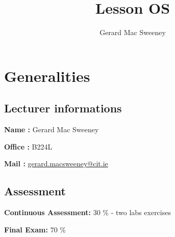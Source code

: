 \documentclass{rapport}
\title{Lesson OS}
\author{Gerard Mac Sweeney}
\begin{document}
\maketitle
\tableofcontents

    \chapter{Generalities}
    \section{Lecturer informations}
    \textbf{Name :} Gerard Mac Sweeney

    \textbf{Office :} B224L

    \textbf{Mail :} \href{mailto:gerard.macsweeney@cit.ie}{gerard.macsweeney@cit.ie}

    \section{Assessment}

    \textbf{Continuous Assessment:} 30 \% - two labs exercises

    \textbf{Final Exam:} 70 \%
\end{document}
